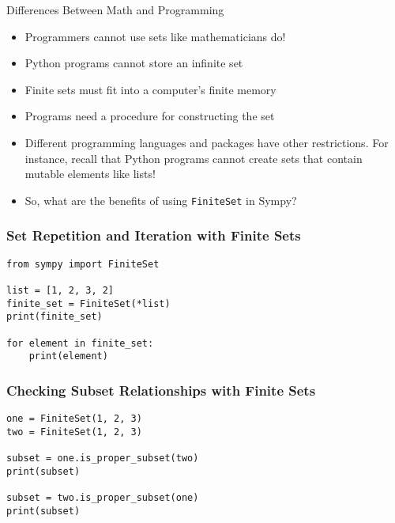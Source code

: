 \documentclass[14pt,aspectratio=169]{beamer}
\begin{document}
%
\begin{frame}{Differences Between Math and Programming}
  \begin{itemize}
    \item Programmers cannot use sets like mathematicians do!
      \vspace*{-.15in}
    \item Python programs cannot store an infinite set
      \vspace*{-.15in}
    \item Finite sets must fit into a computer's finite memory
      \vspace*{-.15in}
    \item Programs need a procedure for constructing the set
      \vspace*{-.15in}
    \item Different programming languages and packages have other restrictions.
      For instance, recall that Python programs cannot create sets that contain
      mutable elements like lists!
      \vspace*{-.15in}
    \item So, what are the benefits of using {\tt FiniteSet} in Sympy?
  \end{itemize}
\end{frame}

%
\begin{frame}[fragile]
  \frametitle{Set Repetition and Iteration with Finite Sets}
  \normalsize
  \begin{minipage}{6in}
    \vspace*{.25in}
    \begin{verbatim}
from sympy import FiniteSet

list = [1, 2, 3, 2]
finite_set = FiniteSet(*list)
print(finite_set)

for element in finite_set:
    print(element)
    \end{verbatim}
  \end{minipage}
\end{frame}

%
\begin{frame}[fragile]
  \frametitle{Checking Subset Relationships with Finite Sets}
  \normalsize
  \begin{minipage}{6in}
    \vspace*{.25in}
    \begin{verbatim}
one = FiniteSet(1, 2, 3)
two = FiniteSet(1, 2, 3)

subset = one.is_proper_subset(two)
print(subset)

subset = two.is_proper_subset(one)
print(subset)
    \end{verbatim}
  \end{minipage}
\end{frame}
\end{document}

